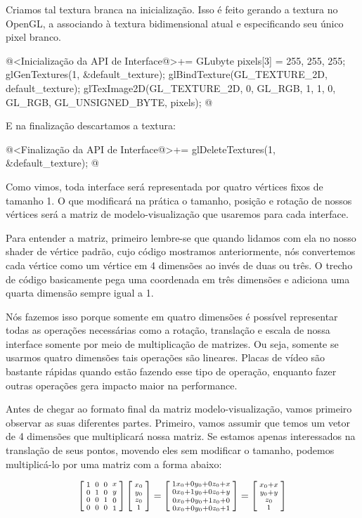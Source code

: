 Criamos tal textura branca na inicialização. Isso é feito gerando a
textura no OpenGL, a associando à textura bidimensional atual e
especificando seu único pixel branco.

\iniciocodigo
@<Inicialização da API de Interface@>+=
{
  GLubyte pixels[3] = {255, 255, 255};
  glGenTextures(1, &default_texture);
  glBindTexture(GL_TEXTURE_2D, default_texture);
  glTexImage2D(GL_TEXTURE_2D, 0, GL_RGB, 1, 1, 0, GL_RGB, GL_UNSIGNED_BYTE,
               pixels);
}
@
\fimcodigo

E na finalização descartamos a textura:

\iniciocodigo
@<Finalização da API de Interface@>+=
glDeleteTextures(1, &default_texture);
@
\fimcodigo


Como vimos, toda interface será representada por quatro vértices fixos
de tamanho 1. O que modificará na prática o tamanho, posição e rotação
de nossos vértices será a matriz de modelo-visualização que usaremos
para cada interface.

Para entender a matriz, primeiro lembre-se que quando lidamos com ela
no nosso shader de vértice padrão, cujo código mostramos
anteriormente, nós convertemos cada vértice como um vértice em 4
dimensões ao invés de duas ou três. O trecho de código
 basicamente pega uma
coordenada em três dimensões e adiciona uma quarta dimensão sempre
igual a 1.

Nós fazemos isso porque somente em quatro dimensões é possível
representar todas as operações necessárias como a rotação, translação
e escala de nossa interface somente por meio de multiplicação de
matrizes. Ou seja, somente se usarmos quatro dimensões tais operações
são lineares. Placas de vídeo são bastante rápidas quando estão
fazendo esse tipo de operação, enquanto fazer outras operações gera
impacto maior na performance.

Antes de chegar ao formato final da matriz modelo-visualização, vamos
primeiro observar as suas diferentes partes. Primeiro, vamos assumir
que temos um vetor de 4 dimensões que multiplicará nossa matriz. Se
estamos apenas interessados na translação de seus pontos, movendo eles
sem modificar o tamanho, podemos multiplicá-lo por uma matriz com a
forma abaixo:

$$ \left[{{1 \atop 0}\atop {0\atop 0}}{{0 \atop 1}\atop {0 \atop
      0}}{{0\atop 0}\atop{1 \atop 0}}{{x \atop y}\atop{0\atop
      1}}\right]\left[{{x_0\atop y_0}\atop {z_0\atop
      1}}\right]=\left[{{1x_0+0y_0+0z_0+x\atop 0x_0+1y_0+0z_0+y}\atop
    {0x_0+0y_0+1z_0+0\atop
      0x_0+0y_0+0z_0+1}}\right]=\left[{{x_0+x\atop y_0+y}\atop
    {z_0\atop 1}}\right]
$$

